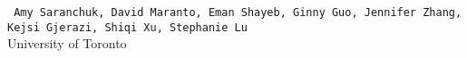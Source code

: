 \begin{center}
    \texttt{
    Amy Saranchuk,
    David Maranto,
    Eman Shayeb,
    Ginny Guo,
    Jennifer Zhang,
    Kejsi Gjerazi,
    Shiqi Xu,
    Stephanie Lu
    } \\
    University of Toronto
\end{center}


